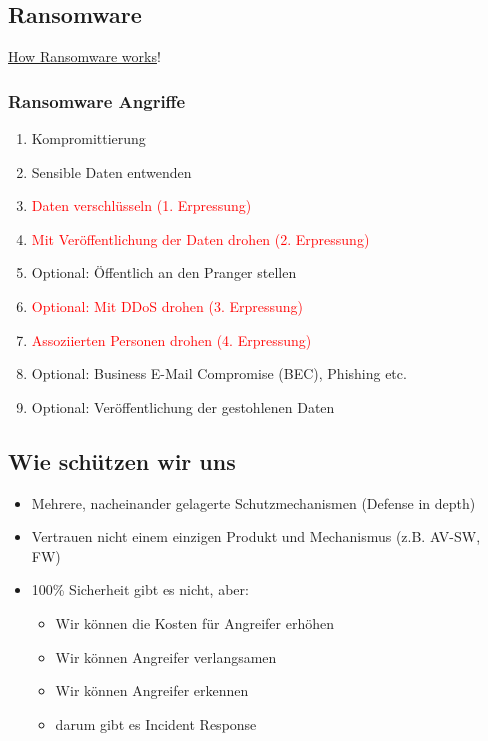 \subsection{Ransomware}
\href{https://www.cert.govt.nz/business/guides/protecting-from-ransomware/}{How Ransomware works}!

\subsubsection{Ransomware Angriffe}
\begin{enumerate}
    \item Kompromittierung
    \item Sensible Daten entwenden
    \item \textcolor{red}{Daten verschlüsseln (1. Erpressung)}
    \item \textcolor{red}{Mit Veröffentlichung der Daten drohen (2. Erpressung)}
    \item Optional: Öffentlich an den Pranger stellen
    \item \textcolor{red}{Optional: Mit DDoS drohen (3. Erpressung)}
    \item \textcolor{red}{Assoziierten Personen drohen (4. Erpressung)}
    \item Optional: Business E-Mail Compromise (BEC), Phishing etc.
    \item Optional: Veröffentlichung der gestohlenen Daten
\end{enumerate}

\subsection{Wie schützen wir uns}
\begin{itemize}
    \item Mehrere, nacheinander gelagerte Schutzmechanismen (Defense in depth)
    \item Vertrauen nicht einem einzigen Produkt und Mechanismus (z.B. AV-SW, FW)
    \item 100\% Sicherheit gibt es nicht, aber:
    \begin{itemize}
        \item Wir können die Kosten für Angreifer erhöhen
        \item Wir können Angreifer verlangsamen
        \item Wir können Angreifer erkennen
        \item darum gibt es Incident Response
    \end{itemize}
\end{itemize}